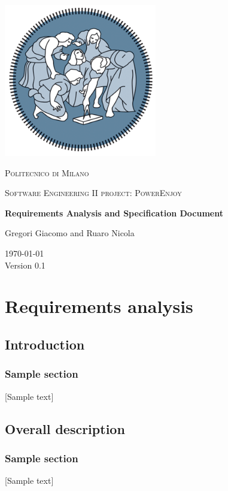 \documentclass[openright]{report}
\def \version {0.1}
\begin{document}
	\begin{titlepage}
		\centering
		\includegraphics[width=0.50\textwidth]{polimi}\\\vspace{0.25cm}
		{\scshape\LARGE Politecnico di Milano\par}\vspace{0.25cm}
		{\scshape\Large Software Engineering II project: PowerEnjoy\par}\vspace{1.5cm}
		{\huge\bfseries Requirements Analysis and Specification Document\par}\vspace{1cm}
		{\large Gregori Giacomo and Ruaro Nicola\par}\vfill

		{\large \today \\Version \version}
	\end{titlepage}

    
    \tableofcontents

    \part{Requirements analysis}
    \chapter{Introduction}
    \section{Sample section}
		[Sample text]
    \chapter{Overall description}
    \section{Sample section}
		[Sample text]
\end{document}
